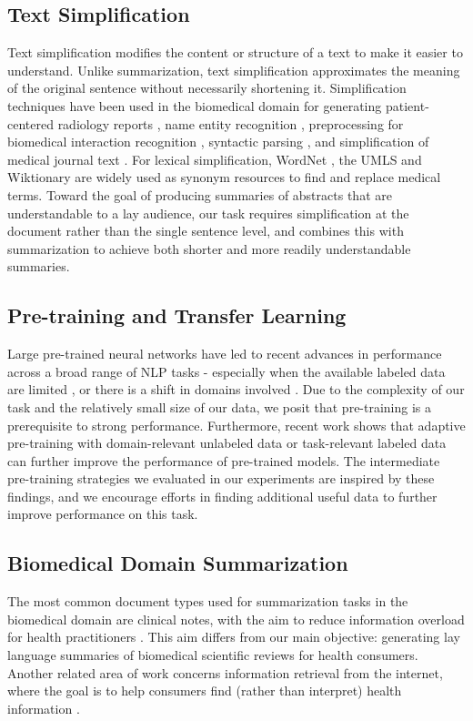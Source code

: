 \documentclass[letterpaper, table]{article}
\begin{document}
\subsection{Text Simplification}
Text simplification \cite{Shardlow2014ASO} modifies the content or structure of a text to make it easier to understand. Unlike summarization, text simplification approximates the meaning of the original sentence without necessarily shortening it.
Simplification techniques have been used in the biomedical domain for generating patient-centered radiology reports \cite{qenam2017text}, name entity recognition \cite{habibi2017deep}, preprocessing for biomedical interaction recognition \cite{baumgartner2008concept}, syntactic parsing \cite{jonnalagadda2010towards}, and simplification of medical journal text \cite{jonnalagadda2010towards}. For lexical simplification, WordNet \cite{miller1995wordnet}, the UMLS \cite{bodenreider2004unified} and Wiktionary \cite{zesch2008extracting} are widely used as synonym resources to find and replace medical terms. Toward the goal of producing summaries of abstracts that are understandable to a lay audience, our task requires simplification at the document rather than the single sentence level, and combines this with summarization to achieve both shorter and more readily
understandable summaries.
\subsection{Pre-training and Transfer Learning}
Large pre-trained neural networks have led to recent advances in performance across a broad range of NLP tasks \cite{peters2018elmo, Radford2018ImprovingLU,Devlin2019BERTPO} - especially when the available labeled data are limited \cite{brown2020language}, or there is a shift in domains involved \cite{Hendrycks2020PretrainedTI}. Due to the complexity of our task and the relatively small size of our data, we posit that pre-training is a prerequisite to strong performance. Furthermore, recent work shows that adaptive pre-training with domain-relevant unlabeled data \cite{Gururangan2020DontSP} or task-relevant labeled data \cite{Pruksachatkun2020IntermediateTaskTL} can further improve the performance of pre-trained models. The intermediate pre-training strategies we evaluated in our experiments are inspired by these findings, and we encourage efforts in finding additional useful data to further improve performance on this task.
\subsection{Biomedical Domain Summarization}
The most common document types used for summarization tasks in the biomedical domain are clinical notes, with the aim to reduce information overload for health practitioners \cite{pivovarov2015automated, feblowitz2011summarization, molla2011development}. This aim differs from our main objective: generating lay language summaries of biomedical scientific reviews for health consumers. Another related area of work concerns information retrieval from the internet, where the goal is to help consumers find (rather than interpret) health information \cite{goeuriot2020overview}.
\end{document}
